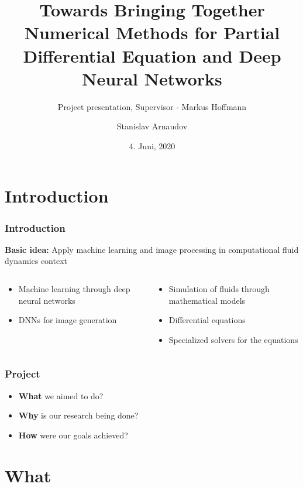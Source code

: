\documentclass[18pt]{beamer}
\title[Project discussion]{Towards Bringing Together Numerical Methods for Partial Differential Equation and Deep Neural Networks}
\subtitle{Project presentation, Supervisor - Markus Hoffmann}
\author{Stanislav Arnaudov}
\institute{Chair for Computer Architecture and Parallel Processing}
\date{4. Juni, 2020}
\begin{document}
\begin{frame}
 \titlepage
\end{frame}

\section{Introduction}

\begin{frame}
  \frametitle{Introduction}
  \textbf{Basic idea:} Apply machine learning and image processing in computational fluid dynamics context

  \begin{columns}[t]
    \begin{column}{0.5\textwidth}

      \begin{itemize}
      \item Machine learning through deep neural networks
      \item DNNs for image generation  
      \end{itemize}
      
    \end{column}
    \begin{column}{0.5\textwidth}

      \begin{itemize}
      \item Simulation of fluids through mathematical models
      \item Differential equations
      \item Specialized solvers for the equations
      \end{itemize}
      
    \end{column}
  \end{columns}
  
\end{frame}

\begin{frame}
  \frametitle{Project}
  \begin{itemize}
  \item \textbf{What} we aimed to do?
  \item \textbf{Why} is our research being done?
  \item \textbf{How} were our goals achieved?
  \end{itemize}
\end{frame}

\section{What}
\end{document}
